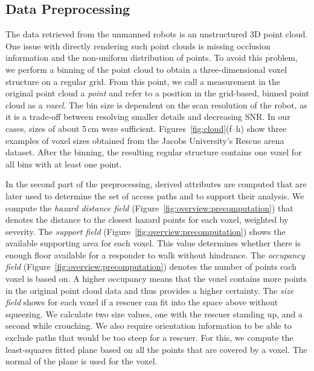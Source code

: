 \documentclass[conference,10pt,letter]{IEEEtran}
\begin{document}
\subsection{Data Preprocessing} \label{sec:overview:preprocessing}
The data retrieved from the unmanned robots is an unstructured 3D point cloud. One issue with directly rendering such point clouds is missing occlusion information and the non-uniform distribution of points. To avoid this problem, we perform a binning of the point cloud to obtain a three-dimensional voxel structure on a regular grid. From this point, we call a measurement in the original point cloud a \emph{point} and refer to a position in the grid-based, binned point cloud as a \emph{voxel}. The bin size is dependent on the scan resolution of the robot, as it is a trade-off between resolving smaller details and decreasing SNR. In our cases, sizes of about 5\,cm were sufficient. Figures~\ref{fig:cloud}(f--h) show three examples of voxel sizes obtained from the Jacobs University's Rescue arena dataset. After the binning, the resulting regular structure contains one voxel for all bins with at least one point.

In the second part of the preprocessing, derived attributes are computed that are later used to determine the set of access paths and to support their analysis. We compute the \emph{hazard distance field} (Figure~\ref{fig:overview:precomputation}) that denotes the distance to the closest hazard points for each voxel, weighted by severity. The \emph{support field} (Figure~\ref{fig:overview:precomputation}) shows the available supporting area for each voxel. This value determines whether there is enough floor available for a responder to walk without hindrance. The \emph{occupancy field} (Figure~\ref{fig:overview:precomputation}) denotes the number of points each voxel is based on. A higher occupancy means that the voxel contains more points in the original point cloud data and thus provides a higher certainty. The \emph{size field} shows for each voxel if a rescuer can fit into the space above without squeezing. We calculate two size values, one with the rescuer standing up, and a second while crouching. We also require orientation information to be able to exclude paths that would be too steep for a rescuer. For this, we compute the least-squares fitted plane based on all the points that are covered by a voxel. The normal of the plane is used for the voxel.
\end{document}
